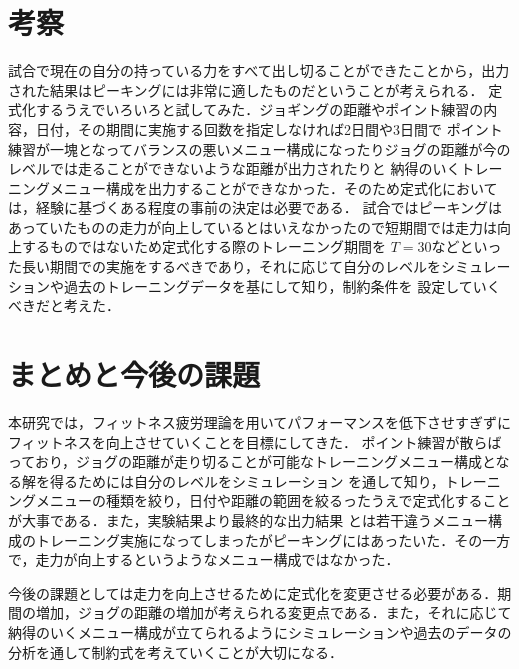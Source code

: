 \documentclass[12pt,fleqn]{jreport}
\begin{document}
\chapter{考察}
\vspace{2cm}
試合で現在の自分の持っている力をすべて出し切ることができたことから，出力された結果はピーキングには非常に適したものだということが考えられる．
定式化するうえでいろいろと試してみた．ジョギングの距離やポイント練習の内容，日付，その期間に実施する回数を指定しなければ2日間や3日間で
ポイント練習が一塊となってバランスの悪いメニュー構成になったりジョグの距離が今のレベルでは走ることができないような距離が出力されたりと
納得のいくトレーニングメニュー構成を出力することができなかった．そのため定式化においては，経験に基づくある程度の事前の決定は必要である．
試合ではピーキングはあっていたものの走力が向上しているとはいえなかったので短期間では走力は向上するものではないため定式化する際のトレーニング期間を
$T=30$などといった長い期間での実施をするべきであり，それに応じて自分のレベルをシミュレーションや過去のトレーニングデータを基にして知り，制約条件を
設定していくべきだと考えた．
\newpage
\chapter{まとめと今後の課題}
\vspace{1cm}
本研究では，フィットネス疲労理論を用いてパフォーマンスを低下させすぎずにフィットネスを向上させていくことを目標にしてきた．
ポイント練習が散らばっており，ジョグの距離が走り切ることが可能なトレーニングメニュー構成となる解を得るためには自分のレベルをシミュレーション
を通して知り，トレーニングメニューの種類を絞り，日付や距離の範囲を絞るったうえで定式化することが大事である．また，実験結果より最終的な出力結果
とは若干違うメニュー構成のトレーニング実施になってしまったがピーキングにはあったいた．その一方で，走力が向上するというようなメニュー構成ではなかった．
\par 今後の課題としては走力を向上させるために定式化を変更させる必要がある．期間の増加，ジョグの距離の増加が考えられる変更点である．また，それに応じて
納得のいくメニュー構成が立てられるようにシミュレーションや過去のデータの分析を通して制約式を考えていくことが大切になる．
\end{document}
